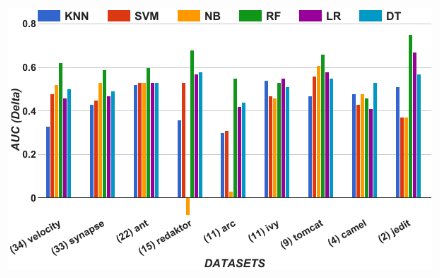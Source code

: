 \begin{figure}[!t]
\begin{minipage}{.5\linewidth}
\centering
        \includegraphics[width=.95\linewidth]{./fig/AUC_tuned.png}
        

\end{minipage}
\end{figure}
